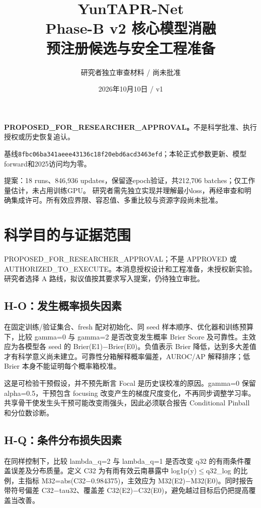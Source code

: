\documentclass[UTF8,fontset=fandol,10pt]{ctexart}
\title{YunTAPR-Net\\Phase-B v2 核心模型消融\\预注册候选与安全工程准备}
\author{研究者独立审查材料 / 尚未批准}
\date{2026年10月10日 / v1}
\begin{document}
\maketitle
\textbf{PROPOSED\_FOR\_RESEARCHER\_APPROVAL。}不是科学批准、执行授权或历史恢复追认。

基线\texttt{8fbc06ba341a\allowbreak{}eee43136c18f\allowbreak{}20ebd6acd3463efd}；本轮正式参数更新、模型forward和2025访问均为零。

提案：18 runs、846,936 updates，保留逐epoch验证，共212,706 batches；仅工作量估计，未占用训练GPU。
研究者需先独立实现并理解最小loss，再经审查和明确集成许可。所有效应界限、容忍值、多重比较与资源字段尚未批准。
\setcounter{tocdepth}{1}\begingroup\small\setlength{\parskip}{0pt}\tableofcontents\endgroup
\clearpage\section{科学目的与证据范围}

PROPOSED\_\allowbreak{}FOR\_\allowbreak{}RESEARCHER\_\allowbreak{}APPROVAL；不是 APPROVED 或 AUTHORIZED\_\allowbreak{}TO\_\allowbreak{}EXECUTE。本消息授权设计和工程准备，未授权新实验。研究者选择 A 路线，拟议值按其要求写入提案，仍待独立审批。

\subsection{H-O：发生概率损失因素}

在固定训练/\allowbreak{}验证集合、fresh 配对初始化、同 seed 样本顺序、优化器和训练预算下，比较 gamma=0 与 gamma=2 是否改变发生概率 Brier Score 及可靠性。主效应为各模型各 seed 的 Brier(E1)\(-\)Brier(E0)。负值表示 Brier 降低，达到多大差值才有科学意义尚未建立。可靠性分箱解释概率偏差，AUROC/\allowbreak{}AP 解释排序；低 Brier 本身不能证明每个概率箱校准。

这是可检验干预假设，并不预先断言 Focal 是历史误校准的原因。gamma=0 保留 alpha=0.5，干预包含 focusing 改变产生的梯度尺度变化，不再同步调整学习率。共享骨干使发生头干预可能改变雨强头，因此必须联合报告 Conditional Pinball 和分位数诊断。

\subsection{H-Q：条件分布损失因素}

在同样控制下，比较 lambda\_\allowbreak{}q=2 与 lambda\_\allowbreak{}q=1 是否改变 q32 的有雨条件覆盖误差及分布质量。定义 C32 为有雨有效云南暴露中 log1p(y)\(\le\)q32\_\allowbreak{}log 的比例，主指标 M32=abs(C32\(-\)0.984375)，主效应为 M32(E2)\(-\)M32(E0)。同时报告带符号偏差 C32\(-\)tau32、覆盖差 C32(E2)\(-\)C32(E0)，避免越过目标后仍把提高覆盖当改善。
\end{document}
